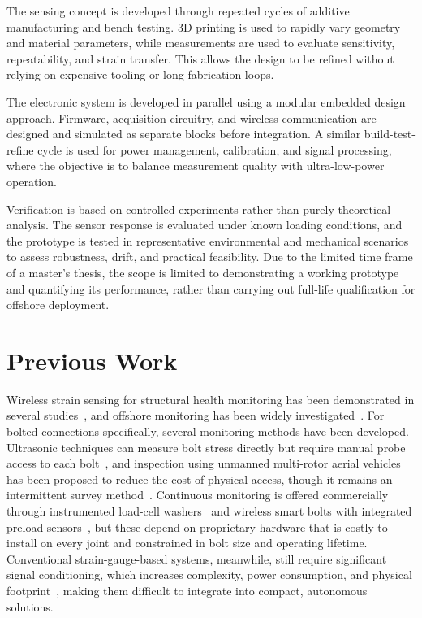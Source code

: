 The sensing concept is developed through repeated cycles of additive manufacturing and bench testing. 3D printing is used to rapidly vary geometry and material parameters, while measurements are used to evaluate sensitivity, repeatability, and strain transfer. This allows the design to be refined without relying on expensive tooling or long fabrication loops.

The electronic system is developed in parallel using a modular embedded design approach. Firmware, acquisition circuitry, and wireless communication are designed and simulated as separate blocks before integration. A similar build-test-refine cycle is used for power management, calibration, and signal processing, where the objective is to balance measurement quality with ultra-low-power operation.

Verification is based on controlled experiments rather than purely theoretical analysis. The sensor response is evaluated under known loading conditions, and the prototype is tested in representative environmental and mechanical scenarios to assess robustness, drift, and practical feasibility. Due to the limited time frame of a master's thesis, the scope is limited to demonstrating a working prototype and quantifying its performance, rather than carrying out full-life qualification for offshore deployment.

\section{Previous Work} \label{sec:previous_work}
Wireless strain sensing for structural health monitoring has been demonstrated in several studies~\cite{SHM_bog, wireless_strain_sensor}, and offshore monitoring has been widely investigated~\cite{offshore_sensor_solutions, WindTurbineStrainSensor, StrainBand}. For bolted connections specifically, several monitoring methods have been developed. Ultrasonic techniques can measure bolt stress directly but require manual probe access to each bolt~\cite{mills_bolt_inspection_2024}, and inspection using unmanned multi-rotor aerial vehicles has been proposed to reduce the cost of physical access, though it remains an intermittent survey method~\cite{zhang_fowt_inspection_2024}. Continuous monitoring is offered commercially through instrumented load-cell washers~\cite{boltsafe_load_cells} and wireless smart bolts with integrated preload sensors~\cite{strainlabs_system}, but these depend on proprietary hardware that is costly to install on every joint and constrained in bolt size and operating lifetime. Conventional strain-gauge-based systems, meanwhile, still require significant signal conditioning, which increases complexity, power consumption, and physical footprint~\cite{MetalFoilStrain}, making them difficult to integrate into compact, autonomous solutions.
 
